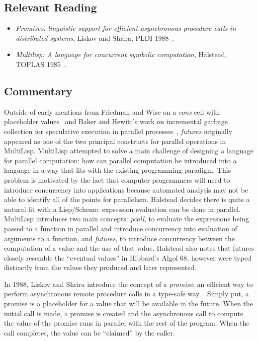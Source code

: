 \subsection{Relevant Reading}

\begin{itemize}
	\item \textit{Promises: linguistic support for efficient asynchronous procedure calls in distributed systems}, Liskov and Shrira, PLDI 1988~\cite{liskov1988promises}.
	\item \textit{Multilisp: A language for concurrent symbolic computation}, Halstead, TOPLAS 1985~\cite{halstead1985multilisp}.
\end{itemize}

\subsection{Commentary}

Outside of early mentions from Friedman and Wise on a \textit{cons} cell with placeholder values~\cite{1675100} and Baker and Hewitt's work on incremental garbage collection for speculative execution in parallel processes~\cite{Baker:1977:IGC:872734.806932}, \textit{futures} originally appeared as one of the two principal constructs for parallel operations in MultiLisp.  MultiLisp attempted to solve a main challenge of designing a language for parallel computation: how can parallel computation be introduced into a language in a way that fits with the existing programming paradigm.  This problem is motivated by the fact that computer programmers will need to introduce concurrency into applications because automated analysis may not be able to identify all of the points for parallelism.  Halstead decides there is quite a natural fit with a Lisp/Scheme: expression evaluation can be done in parallel.  MultiLisp introduces two main concepts: \textit{pcall}, to evaluate the expressions being passed to a function in parallel and introduce concurrency into evaluation of arguments to a function, and \textit{futures}, to introduce concurrency between the computation of a value and the use of that value.  Halstead also notes that futures closely resemble the ``eventual values'' in Hibbard's Algol 68, however were typed distinctly from the values they produced and later represented.~\cite{halstead1985multilisp}

In 1988, Liskov and Shrira introduce the concept of a \textit{promise}: an efficient way to perform asynchronous remote procedure calls in a type-safe way~\cite{liskov1988promises}.  Simply put, a promise is a placeholder for a value that will be available in the future.  When the initial call is made, a promise is created and the asynchronous call to compute the value of the promise runs in parallel with the rest of the program.  When the call completes, the value can be ``claimed'' by the caller.

